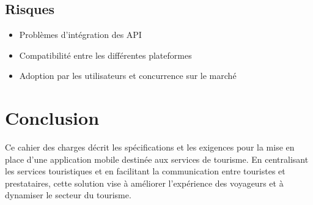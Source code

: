 \documentclass[12pt]{article}
\begin{document}
\subsection{Risques}
\begin{itemize}
    \item Problèmes d’intégration des API
    \item Compatibilité entre les différentes plateformes
    \item Adoption par les utilisateurs et concurrence sur le marché
\end{itemize}

\section{Conclusion}

Ce cahier des charges décrit les spécifications et les exigences pour la mise en place d’une application mobile destinée aux services de tourisme. En centralisant les services touristiques et en facilitant la communication entre touristes et prestataires, cette solution vise à améliorer l’expérience des voyageurs et à dynamiser le secteur du tourisme.
\end{document}

